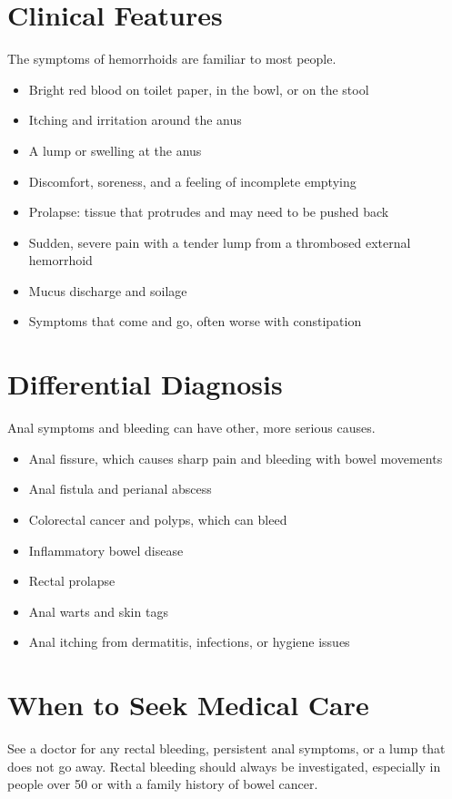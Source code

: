\section*{Clinical Features}
The symptoms of hemorrhoids are familiar to most people.

\begin{itemize}
    \item Bright red blood on toilet paper, in the bowl, or on the stool
    \item Itching and irritation around the anus
    \item A lump or swelling at the anus
    \item Discomfort, soreness, and a feeling of incomplete emptying
    \item Prolapse: tissue that protrudes and may need to be pushed back
    \item Sudden, severe pain with a tender lump from a thrombosed external hemorrhoid
    \item Mucus discharge and soilage
    \item Symptoms that come and go, often worse with constipation
\end{itemize}

\section*{Differential Diagnosis}
Anal symptoms and bleeding can have other, more serious causes.

\begin{itemize}
    \item Anal fissure, which causes sharp pain and bleeding with bowel movements
    \item Anal fistula and perianal abscess
    \item Colorectal cancer and polyps, which can bleed
    \item Inflammatory bowel disease
    \item Rectal prolapse
    \item Anal warts and skin tags
    \item Anal itching from dermatitis, infections, or hygiene issues
\end{itemize}

\section*{When to Seek Medical Care}
See a doctor for any rectal bleeding, persistent anal symptoms, or a lump that does not go away. Rectal bleeding should always be investigated, especially in people over 50 or with a family history of bowel cancer.

